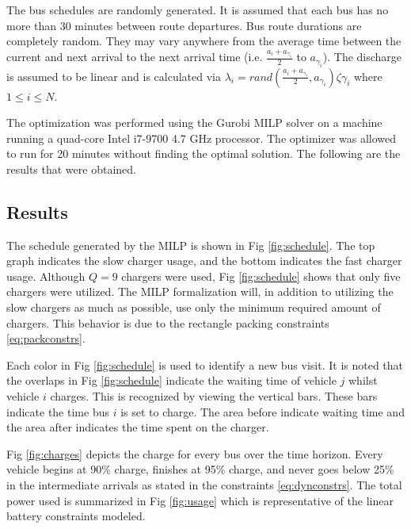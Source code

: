 \documentclass[letterpaper, 10pt, conference]{IEEEtran}
\begin{document}
The bus schedules are randomly generated. It is assumed that each bus has no more than 30 minutes between route departures. Bus route durations are completely random. They may vary anywhere from the average time between the current and next arrival to the next arrival time (i.e. \(\frac{a_i + a_{\gamma_i}}{2}\) to \(a_{\gamma_i}\)). The discharge is assumed to be linear and is calculated via \(\lambda_i = rand(\frac{a_i + a_{\gamma_i}}{2},a_{\gamma_i})\zeta{\gamma_i}\) where \(1 \leq i \leq N\).

The optimization was performed using the Gurobi MILP solver \cite{Hespanha2018} on a machine running a quad-core Intel i7-9700 4.7 GHz processor. The optimizer was allowed to run for 20 minutes without finding the optimal solution. The following are the results that were obtained.

\subsection{Results}
The schedule generated by the MILP is shown in Fig \ref{fig:schedule}. The top graph indicates the slow charger usage, and the bottom indicates the fast charger usage. Although \(Q = 9\) chargers were used, Fig \ref{fig:schedule} shows that only five chargers were utilized. The MILP formalization will, in addition to utilizing the slow chargers as much as possible, use only the minimum required amount of chargers. This behavior is due to the rectangle packing constraints \eqref{eq:packconstrs}.

Each color in Fig \ref{fig:schedule} is used to identify a new bus visit. It is noted that the overlaps in Fig \ref{fig:schedule} indicate the waiting time of vehicle \(j\) whilst vehicle \(i\) charges. This is recognized by viewing the vertical bars. These bars indicate the time bus \(i\) is set to charge. The area before indicate waiting time and the area after indicates the time spent on the charger.

Fig \ref{fig:charges} depicts the charge for every bus over the time horizon. Every vehicle begins at 90\% charge, finishes at 95\% charge, and never goes below 25\% in the intermediate arrivals as stated in the constraints \eqref{eq:dynconstrs}. The total power used is summarized in Fig \ref{fig:usage} which is representative of the linear battery constraints modeled.
\end{document}
